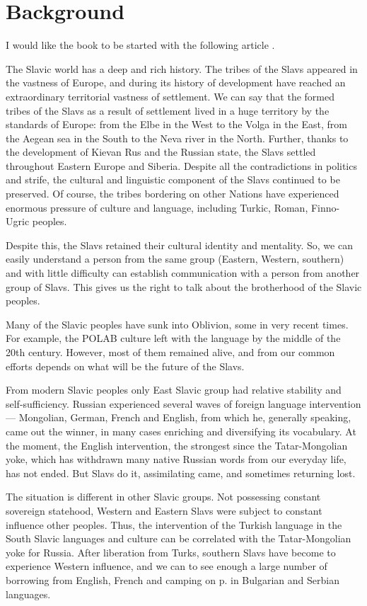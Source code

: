 \chapter{Background}

I would like the book to be started with the following article \cite{intro}.

The Slavic world has a deep and rich history. The tribes of the Slavs appeared in the vastness of Europe, and during its history of development have reached an extraordinary territorial vastness of settlement. We can say that the formed tribes of the Slavs as a result of settlement lived in a huge territory by the standards of Europe: from the Elbe in the West to the Volga in the East, from the Aegean sea in the South to the Neva river in the North. Further, thanks to the development of Kievan Rus and the Russian state, the Slavs settled throughout Eastern Europe and Siberia. Despite all the contradictions in politics and strife, the cultural and linguistic component of the Slavs continued to be preserved. Of course, the tribes bordering on other Nations have experienced enormous pressure of culture and language, including Turkic, Roman, Finno-Ugric peoples.

Despite this, the Slavs retained their cultural identity and mentality. So, we can easily understand a person from the same group (Eastern, Western, southern) and with little difficulty can establish communication with a person from another group of Slavs. This gives us the right to talk about the brotherhood of the Slavic peoples.

Many of the Slavic peoples have sunk into Oblivion, some in very recent times. For example, the POLAB culture left with the language by the middle of the 20th century. However, most of them remained alive, and from our common efforts depends on what will be the future of the Slavs.

From modern Slavic peoples only East Slavic group had relative stability and self-sufficiency. Russian experienced several waves of foreign language intervention — Mongolian, German, French and English, from which he, generally speaking, came out the winner, in many cases enriching and diversifying its vocabulary. At the moment, the English intervention, the strongest since the Tatar-Mongolian yoke, which has withdrawn many native Russian words from our everyday life, has not ended. But Slavs do it, assimilating came, and sometimes returning lost.

The situation is different in other Slavic groups. Not possessing constant sovereign statehood, Western and Eastern Slavs were subject to constant influence other peoples. Thus, the intervention of the Turkish language in the South Slavic languages and culture can be correlated with the Tatar-Mongolian yoke for Russia. After liberation from Turks, southern Slavs have become to experience Western influence, and we can to see enough a large number of borrowing from English, French and camping on p. in Bulgarian and Serbian languages.

